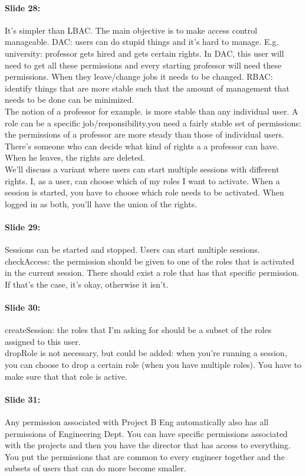 \documentclass[10pt,a4paper]{report}
\begin{document}
\paragraph{Slide 28:} It's simpler than LBAC. The main objective is to make access control manageable. DAC: users can do stupid things and it's hard to manage. E.g. university: professor gets hired and gets certain rights. In DAC, this user will need to get all these permissions and every starting professor will need these permissions. When they leave/change jobs it needs to be changed. RBAC: identify things that are more stable such that the amount of management that needs to be done can be minimized.\\
The notion of a professor for example. is more stable than any individual user. A role can be a specific job/responsibility.you need a fairly stable set of permissions: the permissions of a professor are more steady than those of individual users. There's someone who can decide what kind of rights a a professor can have. When he leaves, the rights are deleted. \\
We'll discuss a variant where users can start multiple sessions with different rights. I, as a user, can choose which of my roles I want to activate. When a session is started, you have to choose which role needs to be activated. When logged in as both, you'll have the union of the rights.

\paragraph{Slide 29:} Sessions can be started and stopped. Users can start multiple sessions.\\
checkAccess: the permission should be given to one of the roles that is activated in the current session. There should exist a role that has that specific permission. If that's the case, it's okay, otherwise it isn't. 

\paragraph{Slide 30:} createSession: the roles that I'm asking for should be a subset of the roles assigned to this user. \\
dropRole is not necessary, but could be added: when you're running a session, you can choose to drop a certain role (when you have multiple roles). You have to make sure that that role is active. 

\paragraph{Slide 31:} Any permission associated with Project B Eng automatically also has all permissions of Engineering Dept. You can have specific permissions associated with the projects and then you have the director that has access to everything. You put the permissions that are common to every engineer together and the subsets of users that can do more become smaller.
\end{document}
